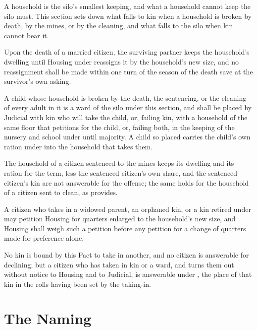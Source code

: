 A household is the silo's smallest keeping, and what a household cannot keep the silo must. This section sets down what falls to kin when a household is broken by death, by the mines, or by the cleaning, and what falls to the silo when kin cannot bear it.

\begin{clauses}
\item Upon the death of a married citizen, the surviving partner keeps the household's dwelling until Housing under  reassigns it by the household's new size, and no reassignment shall be made within one turn of the season of the death save at the survivor's own asking.
\item A child whose household is broken by the death, the sentencing, or the cleaning of every adult in it is a ward of the silo under this section, and shall be placed by Judicial with kin who will take the child, or, failing kin, with a household of the same floor that petitions for the child, or, failing both, in the keeping of the nursery and school under  until majority. A child so placed carries the child's own ration under  into the household that takes them.
\item The household of a citizen sentenced to the mines keeps its dwelling and its ration for the term, less the sentenced citizen's own share, and the sentenced citizen's kin are not answerable for the offense; the same holds for the household of a citizen sent to clean, as  provides.
\item A citizen who takes in a widowed parent, an orphaned kin, or a kin retired under  may petition Housing for quarters enlarged to the household's new size, and Housing shall weigh such a petition before any petition for a change of quarters made for preference alone.
\item No kin is bound by this Pact to take in another, and no citizen is answerable for declining; but a citizen who has taken in kin or a ward, and turns them out without notice to Housing and to Judicial, is answerable under , the place of that kin in the rolls having been set by the taking-in.
\end{clauses}

\section{The Naming}
\label{sec:marriage:naming}

